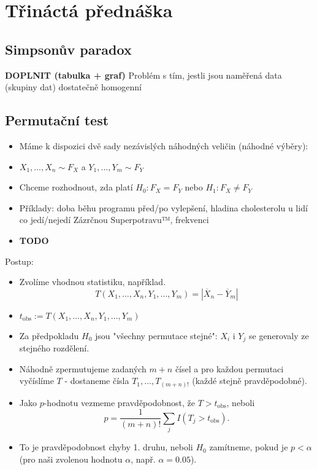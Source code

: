\documentclass[../main.tex]{subfiles}
\begin{document}
\section{Třináctá přednáška}

\subsection{Simpsonův paradox}
\textbf{DOPLNIT (tabulka + graf)}
Problém s tím, jestli jsou naměřená data (skupiny dat) dostatečně homogenní

\subsection{Permutační test}
\begin{example}
    \begin{itemize}
        \item Máme k dispozici dvě sady nezávislých náhodných veličin (náhodné výběry):
        \item $X_1,\dots,X_n \sim F_X$ a $Y_1,\dots,Y_m \sim F_Y$
        \item Chceme rozhodnout, zda platí $H_0 : F_X = F_Y$ nebo $H_1 : F_X \neq F_Y$
        \item Příklady: doba běhu programu před/po vylepšení, hladina cholesterolu u lidí co jedí/nejedí Zázrčnou Superpotravu™, frekvenci
        \item \textbf{TODO} 
    \end{itemize}
    Postup:
    \begin{itemize}
        \item Zvolíme vhodnou statistiku, například.
        \[T(X_1,\dots,X_n,Y_1,\dots,Y_m) = |\overline{X}_n - \overline{Y}_m|\]
        \item $t_{\text{obs}} := T(X_1,\dots,X_n, Y_1,\dots,Y_m)$
        \item Za předpokladu $H_0$ jsou "všechny permutace stejné": $X_i$ i $Y_j$ se generovaly ze stejného rozdělení.
        \item Náhodně zpermutujeme zadaných $m+n$ čísel a pro každou permutaci vyčíslíme $T$ - dostaneme čísla $T_1,\dots,T_{(m+n)!}$ (každé stejně pravděpodobné).
        \item Jako $p$-hodnotu vezmeme pravděpodobnost, že $T > t_{\text{obs}}$, neboli
        \[p = \frac{1}{(m+n)!}\sum_{j} I(T_j>t_{\text{obs}}).\]
        \item To je pravděpodobnost chyby 1. druhu, neboli $H_0$ zamítneme, pokud je $p<\alpha$ (pro naši zvolenou hodnotu $\alpha$, např. $\alpha = 0.05$).

\end{itemize}
\end{example}
\end{document}
